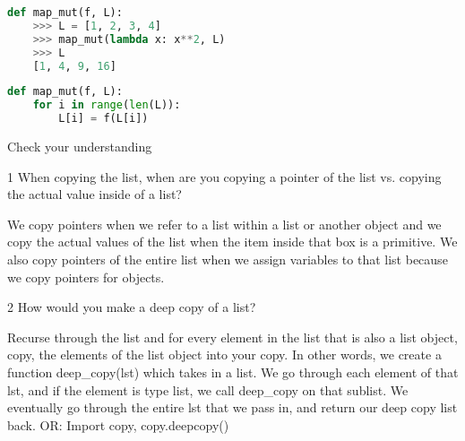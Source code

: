 \begin{lstlisting}[language=Python]
def map_mut(f, L):
    >>> L = [1, 2, 3, 4]
    >>> map_mut(lambda x: x**2, L)
    >>> L
    [1, 4, 9, 16]
\end{lstlisting}
\hfill \break
\hfill \break
\hfill \break
\hfill \break
\hfill \break
\hfill \break
\hfill \break
\begin{solution}
\begin{lstlisting}[language=Python]
def map_mut(f, L):
    for i in range(len(L)):
        L[i] = f(L[i])
\end{lstlisting}
\end{solution}    
\question 
Check your understanding
\begin{paragraph}
1 When copying the list, when are you copying a pointer of the list vs. copying the actual value inside of a list? 
\end{paragraph}
\begin{solution}
We copy pointers when we refer to a list within a list or another object and we copy the actual values of the list when the item inside that box is a primitive. We also copy pointers of the entire list when we assign variables to that list because we copy pointers for objects.

\end{solution}
\begin{paragraph}
2 How would you make a deep copy of a list? 
\begin{solution}
Recurse through the list and for every element in the list that is also a list object, copy, the elements of the list object into your copy. In other words, we create a function deep\_copy(lst) which takes in a list. We go through each element of that lst, and if the element is type list, we call deep\_copy on that sublist. We eventually go through the entire lst that we pass in, and return our deep copy list back.
OR: 
Import copy, copy.deepcopy()
\end{solution}
\end{paragraph}


